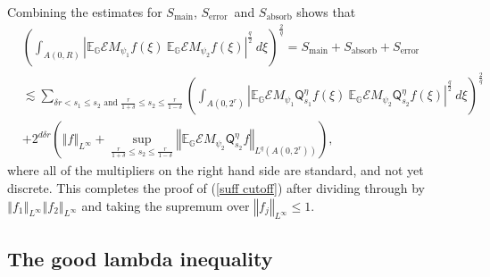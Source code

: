\documentclass{amsart}%
\theoremstyle{plain}
\numberwithin{equation}{section}
\begin{document}
Combining the estimates for $S_{\operatorname*{main}}$,
$S_{\operatorname*{error}}$\ and $S_{\operatorname*{absorb}}$ shows that%
\begin{align}
& \left(  \int_{A\left(  0,R\right)  }\left\vert \mathbb{E}_{\mathbb{G}%
}\mathcal{E}M_{\psi_{1}}f\left(  \xi\right)  \ \mathbb{E}_{\mathbb{G}%
}\mathcal{E}M_{\psi_{2}}f\left(  \xi\right)  \right\vert ^{\frac{q}{2}}%
\ d\xi\right)  ^{\frac{2}{q}}=S_{\operatorname*{main}}%
+S_{\operatorname*{absorb}}+S_{\operatorname*{error}}\label{end}\\
& \lesssim\sum_{\delta r<s_{1}\leq s_{2}\text{ and }\frac{r}{1+\delta}\leq
s_{2}\leq\frac{r}{1-\delta}}\left(  \int_{A\left(  0,2^{r}\right)  }\left\vert
\mathbb{E}_{\mathbb{G}}\mathcal{E}M_{\psi_{1}}\mathsf{Q}_{s_{1}}^{\eta
}f\left(  \xi\right)  \ \mathbb{E}_{\mathbb{G}}\mathcal{E}M_{\psi_{2}%
}\mathsf{Q}_{s_{2}}^{\eta}f\left(  \xi\right)  \right\vert ^{\frac{q}{2}%
}\ d\xi\right)  ^{\frac{2}{q}}\nonumber\\
& +2^{d\delta r}\left(  \left\Vert f\right\Vert _{L^{\infty}}+\sup_{\frac
{r}{1+\delta}\leq s_{2}\leq\frac{r}{1-\delta}}\left\Vert \mathbb{E}%
_{\mathbb{G}}\mathcal{E}M_{\psi_{2}}\mathsf{Q}_{s_{2}}^{\eta}f\right\Vert
_{L^{q}\left(  A\left(  0,2^{r}\right)  \right)  }\right)  ,\nonumber
\end{align}
where all of the multipliers on the right hand side are standard, and not yet
discrete. This completes the proof of (\ref{suff cutoff}) after dividing
through by $\left\Vert f_{1}\right\Vert _{L^{\infty}}\left\Vert f_{2}%
\right\Vert _{L^{\infty}}$ and taking the supremum over $\left\Vert
f_{j}\right\Vert _{L^{\infty}}\leq1$.

\subsection{The good lambda inequality}
\end{document}
